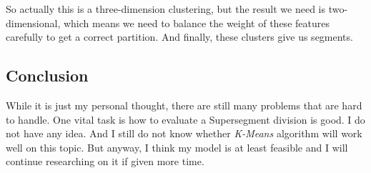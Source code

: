 \documentclass[fontset=none]{ctexart}
\theoremstyle{definition}
\theoremstyle{remark}
\begin{document}
So actually this is a three-dimension clustering, but the result we need is two-dimensional, which means
we need to balance the weight of these features carefully to get a correct partition.
And finally, these clusters give us segments.

\begin{figure}[h]
  \centering
  \quad
\end{figure}

\subsection{Conclusion}
While it is just my personal thought, there are still many problems that are hard to handle.
One vital task is how to evaluate a Supersegment division is good. I do not have any idea.
And I still do not know whether \textit{K-Means} algorithm will work well on this topic.
But anyway, I think my model is at least feasible and I will continue researching on it if given more time.

\clearpage
{}
{}


\end{document}
